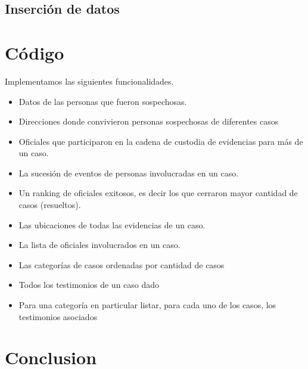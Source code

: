 \documentclass[10pt,a4paper]{article}
\begin{document}
\subsection{Inserción de datos}

\section{Código}
Implementamos las siguientes funcionalidades.

\begin{itemize}
\item Datos de las personas que fueron sospechosas.
\item Direcciones donde convivieron personas sospechosas de diferentes casos
\item Oficiales que participaron en la cadena de custodia de evidencias para más de un
caso.
\item La sucesión de eventos de personas involucradas en un caso.
\item Un ranking de oficiales exitosos, es decir los que cerraron mayor cantidad de casos
(resueltos).
\item Las ubicaciones de todas las evidencias de un caso.
\item La lista de oficiales involucrados en un caso.
\item Las categorías de casos ordenadas por cantidad de casos
\item Todos los testimonios de un caso dado
\item Para una categoría en particular listar, para cada uno de los casos, los testimonios
asociados
\end{itemize}
\section{Conclusion}
\end{document}
